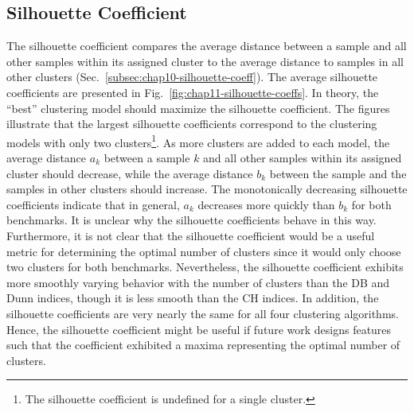 \clearpage

\subsection{Silhouette Coefficient}
\label{subsec:chap11-silhouette-coeff}

The silhouette coefficient compares the average distance between a sample and all other samples within its assigned cluster to the average distance to samples in all other clusters (Sec.~\ref{subsec:chap10-silhouette-coeff}). The average silhouette coefficients are presented in Fig.~\ref{fig:chap11-silhouette-coeffs}. In theory, the ``best'' clustering model should maximize the silhouette coefficient. The figures illustrate that the largest silhouette coefficients correspond to the clustering models with only two clusters\footnote{The silhouette coefficient is undefined for a single cluster.}. As more clusters are added to each model, the average distance $a_{k}$ between a sample $k$ and all other samples within its assigned cluster should decrease, while the average distance $b_{k}$ between the sample and the samples in other clusters should increase. The monotonically decreasing silhouette coefficients indicate that in general, $a_{k}$ decreases more quickly than $b_{k}$ for both benchmarks. It is unclear why the silhouette coefficients behave in this way. Furthermore, it is not clear that the silhouette coefficient would be a useful metric for determining the optimal number of clusters since it would only choose two clusters for both benchmarks. Nevertheless, the silhouette coefficient exhibits more smoothly varying behavior with the number of clusters than the DB and Dunn indices, though it is less smooth than the CH indices. In addition, the silhouette coefficients are very nearly the same for all four clustering algorithms. Hence, the silhouette coefficient might be useful if future work designs features such that the coefficient exhibited a maxima representing the optimal number of clusters.


